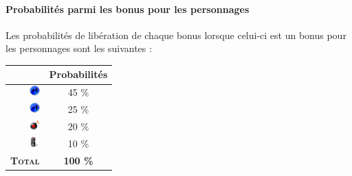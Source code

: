 \paragraph{Probabilités parmi les bonus pour les personnages}
Les probabilités de libération de chaque bonus lorsque celui-ci est un bonus pour les personnages sont les suivantes :\begin{center}
\begin{tabular}{|r|c|}
\hline 
& Probabilités \\ 
\hline 
\includegraphics[width=15px,height=15px]{images/vitesseMore.png} & 45 \% \\ 
\hline 
\includegraphics[width=15px,height=15px]{images/vitesseLess.png} & 25 \% \\ 
\hline 
\includegraphics[width=15px,height=15px]{images/bombLine.png} & 20 \% \\ 
\hline 
\includegraphics[width=15px,height=15px]{images/remote.png} & 10 \% \\ 
\hline 
\textbf{\textsc{Total}} & \textbf{100 \%} \\ 
\hline 
\end{tabular} 
\end{center}


